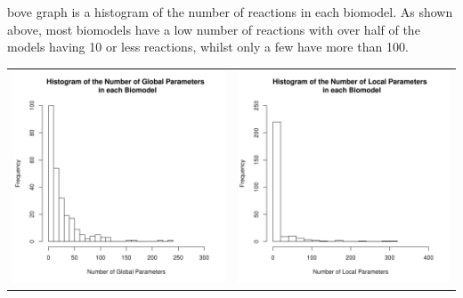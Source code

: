 \documentclass[portrait,a0paper,fontscale=0.35]{baposter}
\begin{document}
\begin{poster}
{\begin{multicols}{2}
bove graph is a histogram of the number of reactions in each biomodel. As shown above, most biomodels have a low number of reactions with over half of the models having 10 or less reactions, whilst only a few have more than 100.\\
 
 \end{multicols}
 
 \begin{tabular}{l r}
 \includegraphics[trim= 1.5mm 5mm 5mm 5mm, clip, scale=0.4]{Poster-images/GlobalParametersHistogram.png} & \includegraphics[trim= 1.5mm 5mm 5mm 5mm, clip, scale=0.4]{Poster-images/LocalParametersHistogram.png}\\
 \end{tabular}
 
}
\end{poster}
\end{document}
